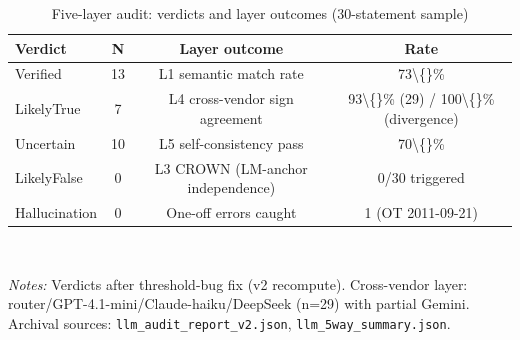 \begin{table}[!tbp]
\centering\small
\caption{Five-layer audit: verdicts and layer outcomes (30-statement sample)}
\label{tab:a1}
\begin{tabular}{lccc}
\toprule
Verdict & N & Layer outcome & Rate \\
\midrule
Verified & 13 & L1 semantic match rate & 73\textbackslash\{\}\% \\
LikelyTrue & 7 & L4 cross-vendor sign agreement & 93\textbackslash\{\}\% (29) / 100\textbackslash\{\}\% (divergence) \\
Uncertain & 10 & L5 self-consistency pass & 70\textbackslash\{\}\% \\
LikelyFalse & 0 & L3 CROWN (LM-anchor independence) & 0/30 triggered \\
Hallucination & 0 & One-off errors caught & 1 (OT 2011-09-21) \\
\bottomrule
\end{tabular}
\\[2pt]\begin{minipage}{0.92\linewidth}\footnotesize\emph{Notes:} Verdicts after threshold-bug fix (v2 recompute). Cross-vendor layer: router/GPT-4.1-mini/Claude-haiku/DeepSeek (n=29) with partial Gemini. Archival sources: \texttt{llm\_audit\_report\_v2.json}, \texttt{llm\_5way\_summary.json}.\end{minipage}
\end{table}
